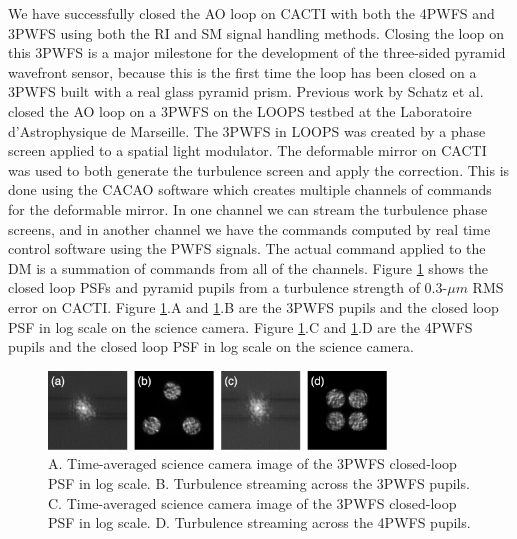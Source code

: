 \documentclass[12pt]{spieman}  %
\begin{document}
\begin{spacing}{2}
We have successfully closed the AO loop on CACTI with both the 4PWFS and 3PWFS using both the RI and SM signal handling methods. Closing the loop on this 3PWFS is a major milestone for the development of the three-sided pyramid wavefront sensor, because this is the first time the loop has been closed on a 3PWFS built with a real glass pyramid prism. Previous work by Schatz et al. closed the AO loop on a 3PWFS on the LOOPS testbed at the Laboratoire d'Astrophysique de Marseille. The 3PWFS in LOOPS was created by a phase screen applied to a spatial light modulator. The deformable mirror on CACTI was used to both generate the turbulence screen and apply the correction. This is done using the CACAO software which creates multiple channels of commands for the deformable mirror. In one channel we can stream the turbulence phase screens, and in another channel we have the commands computed by real time control software using the PWFS signals. The actual command applied to the DM is a summation of commands from all of the channels. Figure \ref{fig:turbCACTI} shows the closed loop PSFs and pyramid pupils from a turbulence strength of 0.3-$\mu m$ RMS error on CACTI. Figure \ref{fig:turbCACTI}.A and \ref{fig:turbCACTI}.B are the 3PWFS pupils and the closed loop PSF in log scale on the science camera. Figure \ref{fig:turbCACTI}.C and \ref{fig:turbCACTI}.D are the 4PWFS pupils and the closed loop PSF in log scale on the science camera.


\begin{figure}
    \centering
    \includegraphics[width=0.8\textwidth]{turbCACTI.png}
    \caption{A. Time-averaged science camera image of the 3PWFS closed-loop PSF in log scale. B. Turbulence streaming across the 3PWFS pupils. C. Time-averaged science camera image of the 3PWFS closed-loop PSF in log scale. D. Turbulence streaming across the 4PWFS pupils.}
    \label{fig:turbCACTI}
\end{figure}

				

\end{spacing}
\end{document}
